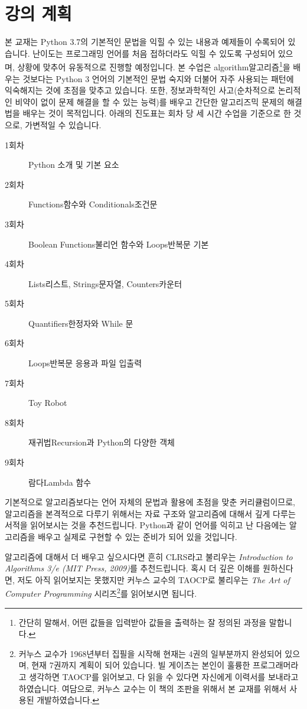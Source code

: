 \documentclass[../main.tex]{subfiles}
\begin{document}
\section{강의 계획}
본 교재는 Python 3.7의 기본적인 문법을 익힐 수 있는 내용과 예제들이 수록되어 있습니다.
난이도는 프로그래밍 언어를 처음 접하더라도 익힐 수 있도록 구성되어 있으며, 상황에 맞추어 유동적으로 진행할 예정입니다.
본 수업은 algorithm알고리즘\footnote{간단히 말해서, 어떤 값들을 입력받아 값들을 출력하는 잘 정의된 과정을 말합니다.}을 배우는 것보다는 Python 3 언어의 기본적인 문법 숙지와 더불어 자주 사용되는 패턴에 익숙해지는 것에 초점을 맞추고 있습니다.
또한, 정보과학적인 사고(순차적으로 논리적인 비약이 없이 문제 해결을 할 수 있는 능력)를 배우고 간단한 알고리즈믹 문제의 해결법을 배우는 것이 목적입니다.
아래의 진도표는 회차 당 세 시간 수업을 기준으로 한 것으로, 가변적일 수 있습니다.

\begin{description}
  \item[1회차] Python 소개 및 기본 요소
  \item[2회차] Functions함수와 Conditionals조건문
  \item[3회차] Boolean Functions불리언 함수와 Loops반복문 기본
  \item[4회차] Lists리스트, Strings문자열, Counters카운터
  \item[5회차] Quantifiers한정자와 While 문
  \item[6회차] Loops반복문 응용과 파일 입출력
  \item[7회차] Toy Robot
  \item[8회차] 재귀법Recursion과 Python의 다양한 객체
  \item[9회차] 람다Lambda 함수
\end{description}

기본적으로 알고리즘보다는 언어 자체의 문법과 활용에 초점을 맞춘 커리큘럼이므로, 알고리즘을 본격적으로 다루기 위해서는 자료 구조와 알고리즘에 대해서 깊게 다루는 서적을 읽어보시는 것을 추천드립니다.
Python과 같이 언어를 익히고 난 다음에는 알고리즘을 배우고 실제로 구현할 수 있는 준비가 되어 있을 것입니다.

알고리즘에 대해서 더 배우고 싶으시다면 흔히 CLRS라고 불리우는 \textit{Introduction to Algorithms 3/e (MIT Press, 2009)}를 추천드립니다.
혹시 더 깊은 이해를 원하신다면, 저도 아직 읽어보지는 못했지만 커누스 교수의 TAOCP로 불리우는 \textit{The Art of Computer Programming} 시리즈\footnote{커누스 교수가 1968년부터 집필을 시작해 현재는 4권의 일부분까지 완성되어 있으며, 현재 7권까지 계획이 되어 있습니다. 빌 게이츠는 본인이 훌륭한 프로그래머라고 생각하면 TAOCP를 읽어보고, 다 읽을 수 있다면 자신에게 이력서를 보내라고 하였습니다. 여담으로, 커누스 교수는 이 책의 조판을 위해서 본 교재를 위해서 사용된  개발하였습니다.}를 읽어보시면 됩니다.
\end{document}
